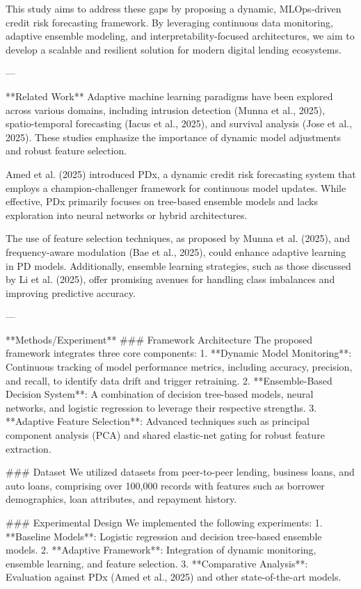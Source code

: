 This study aims to address these gaps by proposing a dynamic, MLOps-driven credit risk forecasting framework. By leveraging continuous data monitoring, adaptive ensemble modeling, and interpretability-focused architectures, we aim to develop a scalable and resilient solution for modern digital lending ecosystems.  

---

**Related Work**  
Adaptive machine learning paradigms have been explored across various domains, including intrusion detection (Munna et al., 2025), spatio-temporal forecasting (Iacus et al., 2025), and survival analysis (Jose et al., 2025). These studies emphasize the importance of dynamic model adjustments and robust feature selection.  

Amed et al. (2025) introduced PDx, a dynamic credit risk forecasting system that employs a champion-challenger framework for continuous model updates. While effective, PDx primarily focuses on tree-based ensemble models and lacks exploration into neural networks or hybrid architectures.  

The use of feature selection techniques, as proposed by Munna et al. (2025), and frequency-aware modulation (Bae et al., 2025), could enhance adaptive learning in PD models. Additionally, ensemble learning strategies, such as those discussed by Li et al. (2025), offer promising avenues for handling class imbalances and improving predictive accuracy.  

---

**Methods/Experiment**  
### Framework Architecture  
The proposed framework integrates three core components:  
1. **Dynamic Model Monitoring**: Continuous tracking of model performance metrics, including accuracy, precision, and recall, to identify data drift and trigger retraining.  
2. **Ensemble-Based Decision System**: A combination of decision tree-based models, neural networks, and logistic regression to leverage their respective strengths.  
3. **Adaptive Feature Selection**: Advanced techniques such as principal component analysis (PCA) and shared elastic-net gating for robust feature extraction.  

### Dataset  
We utilized datasets from peer-to-peer lending, business loans, and auto loans, comprising over 100,000 records with features such as borrower demographics, loan attributes, and repayment history.  

### Experimental Design  
We implemented the following experiments:  
1. **Baseline Models**: Logistic regression and decision tree-based ensemble models.  
2. **Adaptive Framework**: Integration of dynamic monitoring, ensemble learning, and feature selection.  
3. **Comparative Analysis**: Evaluation against PDx (Amed et al., 2025) and other state-of-the-art models.  

